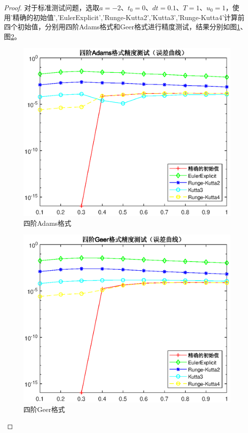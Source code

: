 \documentclass{article}%
\begin{document}
\begin{proof}
	对于标准测试问题，选取$a=-2$、$t_0=0$、$dt=0.1$、$T=1$、$u_0=1$，使用'精确的初始值','EulerExplicit','Runge-Kutta2','Kutta3','Runge-Kutta4'计算前四个初始值，分别用四阶Adams格式和Geer格式进行精度测试，结果分别如图\ref{Fig:1}、图\ref{Fig:2}。
	
	\begin{figure}
		\includegraphics[width=1\linewidth]{week6_2_1.eps}
		\caption{四阶Adams格式}  
		\label{Fig:1}
	\end{figure}

\begin{figure}
	\includegraphics[width=1\linewidth]{week6_2_2.eps}
	\caption{四阶Geer格式}  
	\label{Fig:2}
\end{figure}
	
	
	
\end{proof}
\end{document}
